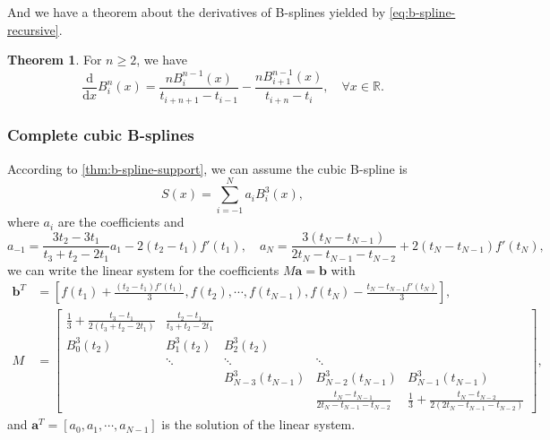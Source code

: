 \documentclass[a4paper]{article}
\theoremstyle{definition}
\newtheorem{theorem}{Theorem}
\begin{document}
\vspace{1em}
And we have a theorem about the derivatives of B-splines yielded by \cref{eq:b-spline-recursive}.
\begin{theorem}
  For $n \geqslant 2$, we have 
  \begin{equation}
    \frac{\mathrm{d}}{\mathrm{d}x}B_i^n(x) = \frac{nB_i^{n - 1}(x)}{t_{i + n + 1} - t_{i - 1}} - \frac{nB_{i + 1}^{n - 1}(x)}{t_{i + n} - t_i}, \quad \forall x \in \mathbb{R}.
    \label{eq:b-spline-derivative}
  \end{equation}
\end{theorem}

\subsubsection{Complete cubic B-splines}
\label{sec:complete-cubic-b-splines}

According to \cref{thm:b-spline-support}, we can assume the cubic B-spline is 
\begin{equation}
  S(x) = \sum_{i = -1}^N a_i B_i^3(x),
  \label{eq:complete-cubic-b-spline}
\end{equation}
where $a_i$ are the coefficients and 
\begin{equation}
  a_{-1} = \frac{3t_2 - 3t_1}{t_3 + t_2 - 2t_1} a_1 - 2(t_2 - t_1)f'(t_1),\quad a_N = \frac{3(t_N - t_{N - 1})}{2t_N - t_{N - 1} - t_{N - 2}} + 2(t_N - t_{N - 1})f'(t_N),
  \label{eq:complete-cubic-b-spline-coefficients}
\end{equation}
we can write the linear system for the coefficients $M\mathbf{a} = \mathbf{b}$ with
\begin{equation}
  \begin{aligned}
    \mathbf{b}^T &= [f(t_1) + \frac{(t_2 - t_1)f'(t_1)}{3}, f(t_2), \cdots, f(t_{N - 1}), f(t_N) - \frac{t_N - t_{N - 1}f'(t_N)}{3}], \\
    M &= \begin{bmatrix}
      \frac{1}{3} + \frac{t_3 - t_1}{2(t_3 + t_2 - 2t_1)} & \frac{t_2 - t_1}{t_3 + t_2 - 2t_1} &    &    &    \\
      B_0^3(t_2) & B_1^3(t_2) & B_2^3(t_2) &    &    \\
        & \ddots & \ddots & \ddots &    \\
        &    & B_{N - 3}^3(t_{N - 1}) & B_{N - 2}^3(t_{N - 1}) & B_{N - 1}^3(t_{N - 1}) \\
        &    &    & \frac{t_N - t_{N - 1}}{2t_N - t_{N - 1} - t_{N - 2}} & \frac{1}{3} + \frac{t_N - t_{N - 2}}{2(2t_N - t_{N - 1} - t_{N - 2})}
    \end{bmatrix},
  \end{aligned}
  \label{eq:complete-cubic-b-spline-linear-system}
\end{equation}
and $\mathbf{a}^T = [a_0, a_1, \cdots, a_{N - 1}]$ is the solution of the linear system.
\end{document}
